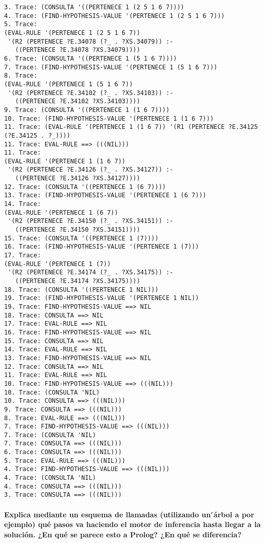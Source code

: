 \documentclass[nochap]{apuntes}
\begin{document}
\begin{verbatim}
3. Trace: (CONSULTA '((PERTENECE 1 (2 5 1 6 7))))
4. Trace: (FIND-HYPOTHESIS-VALUE '(PERTENECE 1 (2 5 1 6 7)))
5. Trace: 
(EVAL-RULE '(PERTENECE 1 (2 5 1 6 7))
 '(R2 (PERTENECE ?E.34078 (?_ . ?XS.34079)) :-
   ((PERTENECE ?E.34078 ?XS.34079))))
6. Trace: (CONSULTA '((PERTENECE 1 (5 1 6 7))))
7. Trace: (FIND-HYPOTHESIS-VALUE '(PERTENECE 1 (5 1 6 7)))
8. Trace: 
(EVAL-RULE '(PERTENECE 1 (5 1 6 7))
 '(R2 (PERTENECE ?E.34102 (?_ . ?XS.34103)) :-
   ((PERTENECE ?E.34102 ?XS.34103))))
9. Trace: (CONSULTA '((PERTENECE 1 (1 6 7))))
10. Trace: (FIND-HYPOTHESIS-VALUE '(PERTENECE 1 (1 6 7)))
11. Trace: (EVAL-RULE '(PERTENECE 1 (1 6 7)) '(R1 (PERTENECE ?E.34125 (?E.34125 . ?_))))
11. Trace: EVAL-RULE ==> (((NIL)))
11. Trace: 
(EVAL-RULE '(PERTENECE 1 (1 6 7))
 '(R2 (PERTENECE ?E.34126 (?_ . ?XS.34127)) :-
   ((PERTENECE ?E.34126 ?XS.34127))))
12. Trace: (CONSULTA '((PERTENECE 1 (6 7))))
13. Trace: (FIND-HYPOTHESIS-VALUE '(PERTENECE 1 (6 7)))
14. Trace: 
(EVAL-RULE '(PERTENECE 1 (6 7))
 '(R2 (PERTENECE ?E.34150 (?_ . ?XS.34151)) :-
   ((PERTENECE ?E.34150 ?XS.34151))))
15. Trace: (CONSULTA '((PERTENECE 1 (7))))
16. Trace: (FIND-HYPOTHESIS-VALUE '(PERTENECE 1 (7)))
17. Trace: 
(EVAL-RULE '(PERTENECE 1 (7))
 '(R2 (PERTENECE ?E.34174 (?_ . ?XS.34175)) :-
   ((PERTENECE ?E.34174 ?XS.34175))))
18. Trace: (CONSULTA '((PERTENECE 1 NIL)))
19. Trace: (FIND-HYPOTHESIS-VALUE '(PERTENECE 1 NIL))
19. Trace: FIND-HYPOTHESIS-VALUE ==> NIL
18. Trace: CONSULTA ==> NIL
17. Trace: EVAL-RULE ==> NIL
16. Trace: FIND-HYPOTHESIS-VALUE ==> NIL
15. Trace: CONSULTA ==> NIL
14. Trace: EVAL-RULE ==> NIL
13. Trace: FIND-HYPOTHESIS-VALUE ==> NIL
12. Trace: CONSULTA ==> NIL
11. Trace: EVAL-RULE ==> NIL
10. Trace: FIND-HYPOTHESIS-VALUE ==> (((NIL)))
10. Trace: (CONSULTA 'NIL)
10. Trace: CONSULTA ==> (((NIL)))
9. Trace: CONSULTA ==> (((NIL)))
8. Trace: EVAL-RULE ==> (((NIL)))
7. Trace: FIND-HYPOTHESIS-VALUE ==> (((NIL)))
7. Trace: (CONSULTA 'NIL)
7. Trace: CONSULTA ==> (((NIL)))
6. Trace: CONSULTA ==> (((NIL)))
5. Trace: EVAL-RULE ==> (((NIL)))
4. Trace: FIND-HYPOTHESIS-VALUE ==> (((NIL)))
4. Trace: (CONSULTA 'NIL)
4. Trace: CONSULTA ==> (((NIL)))
3. Trace: CONSULTA ==> (((NIL)))
\end{verbatim}


\paragraph{ Explica mediante un esquema de llamadas (utilizando un  ́árbol a por ejemplo) qué pasos va haciendo el motor de inferencia hasta llegar a la solución. ¿En qué se parece esto a Prolog? ¿En qué se diferencia?\\}
\end{document}
